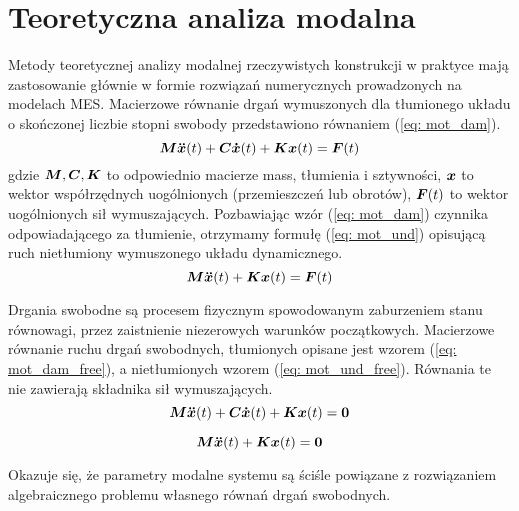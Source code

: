 \section{Teoretyczna analiza modalna}
\label{section: eigen}
Metody teoretycznej analizy modalnej rzeczywistych konstrukcji w praktyce mają zastosowanie głównie w formie rozwiązań numerycznych prowadzonych na modelach MES. Macierzowe równanie drgań wymuszonych dla tłumionego układu o skończonej liczbie stopni swobody przedstawiono równaniem (\ref{eq: mot_dam}). 
\begin{equation} \label{eq: mot_dam}
\bm{M} \bm{\ddot{x}}(t) +\bm{C} \bm{\dot{x}}(t)+ \bm{Kx}(t) = \bm{F}(t)
\end{equation}
gdzie $\bm{M},\bm{C},\bm{K}$ to odpowiednio macierze mass, tłumienia i sztywności, $\bm{x}$ to wektor współrzędnych uogólnionych (przemieszczeń lub obrotów), $\bm{F}(t)$ to wektor uogólnionych sił wymuszających. Pozbawiając wzór (\ref{eq: mot_dam}) czynnika odpowiadającego za tłumienie, otrzymamy formułę (\ref{eq: mot_und}) opisującą ruch nietłumiony wymuszonego układu dynamicznego. 
\begin{equation} \label{eq: mot_und}
\bm{M} \bm{\ddot{x}}(t) +\bm{Kx}(t) = \bm{F}(t)
\end{equation}

Drgania swobodne są procesem fizycznym spowodowanym zaburzeniem stanu równowagi, przez zaistnienie niezerowych warunków początkowych. Macierzowe równanie ruchu drgań swobodnych, tłumionych opisane jest wzorem (\ref{eq: mot_dam_free}), a nietłumionych wzorem (\ref{eq: mot_und_free}). Równania te nie zawierają składnika sił wymuszających.
\begin{equation} \label{eq: mot_dam_free}
\bm{M} \bm{\ddot{x}}(t) +\bm{C} \bm{\dot{x}}(t)+ \bm{Kx}(t) = \bm{0}
\end{equation}

\begin{equation} \label{eq: mot_und_free}
\bm{M} \bm{\ddot{x}}(t) +\bm{Kx}(t) = \bm{0}
\end{equation}

Okazuje się, że parametry modalne systemu są ściśle powiązane z rozwiązaniem algebraicznego problemu własnego równań drgań swobodnych. 

